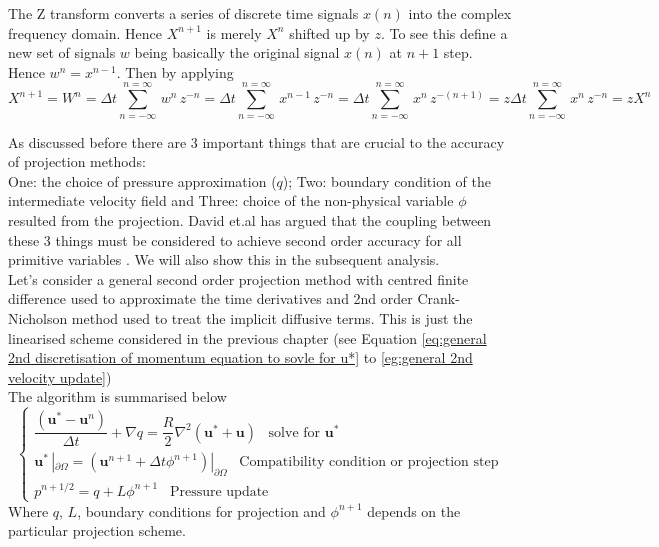 The Z transform converts a series of discrete time signals $x(n)$ into the complex frequency domain. Hence $X^{n+1}$ is merely $X^n$ shifted up by $z$. To see this define a new set of signals $w$ being basically the original signal $x(n)$ at $n+1$ step. Hence $w^n = x^{n-1}$. Then by applying 
\begin{dmath}
X^{n+1} = W^n
= \Delta t \sum_{n=-\infty}^{n=\infty}\,w^n\,z^{-n} =  \Delta t \sum_{n=-\infty}^{n=\infty}\,x^{n-1}\,z^{-n} 
=  \Delta t \sum_{n=-\infty}^{n=\infty}\,x^n\,z^{-(n+1)} = z \Delta t \sum_{n=-\infty}^{n=\infty}\,x^n\,z^{-n} 
= z X^n
\end{dmath}

As discussed before there are 3 important things that are crucial to the accuracy of projection methods:\\
One: the choice of pressure approximation ($q$); Two: boundary condition of the intermediate velocity field and Three: choice of the non-physical variable $\phi$ resulted from the projection. David et.al has argued that the coupling between these 3 things must be considered to achieve second order accuracy for all primitive variables \cite{brown2001accurate}. We will also show this in the subsequent analysis.\\

Let's consider a general second order projection method with centred finite difference used to approximate the time derivatives and 2nd order Crank-Nicholson method used to treat the implicit diffusive terms. This is just the linearised scheme considered in the previous chapter (see Equation \eqref{eq:general 2nd discretisation of momentum equation to sovle for u*} to \eqref{eg:general 2nd velocity update})\\

The algorithm is summarised below\\
\begin{equation}\label{eq:general 2nd projection method for linearised Stokes equations}
\begin{cases}
\dfrac{(\textbf{u}^* - \textbf{u}^n)}{\Delta t} + \nabla q = \dfrac{R}{2} \nabla^2 (\textbf{u}^* + \textbf{u})\,\,\,\text{   solve for $\textbf{u}^*$}\\
\textbf{u}^* \,|_{\partial \Omega}= \left(\textbf{u}^{n+1} + \Delta t \phi^{n+1}\right)|_{\partial \Omega}\,\,\,\text{   Compatibility condition or projection step}\\
p^{n+1/2} = q + L \phi^{n+1}\,\,\,\text{   Pressure update}
\end{cases}
\end{equation}
Where $q, \,L$, boundary conditions for projection and $\phi^{n+1}$ depends on the particular projection scheme.

